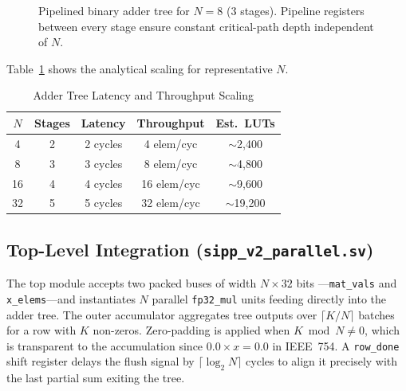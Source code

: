 \documentclass[journal,a4paper]{IEEEtran}
\begin{document}
\begin{figure}[!t]
\caption{Pipelined binary adder tree for $N=8$ (3 stages). Pipeline
registers between every stage ensure constant critical-path depth
independent of $N$.}
\label{fig:addertree}
\end{figure}

Table~\ref{tab:scaling} shows the analytical scaling for representative $N$.

\begin{table}[!t]
\centering
\caption{Adder Tree Latency and Throughput Scaling}
\label{tab:scaling}
\begin{tabular}{ccccc}
\toprule
$N$ & Stages & Latency & Throughput & Est.\ LUTs \\
\midrule
4  & 2 & 2 cycles & 4 elem/cyc  & $\sim$2,400 \\
8  & 3 & 3 cycles & 8 elem/cyc  & $\sim$4,800 \\
16 & 4 & 4 cycles & 16 elem/cyc & $\sim$9,600 \\
32 & 5 & 5 cycles & 32 elem/cyc & $\sim$19,200\\
\bottomrule
\end{tabular}
\end{table}

\subsection{Top-Level Integration (\texttt{sipp\_v2\_parallel.sv})}

The top module accepts two packed buses of width $N \times 32$ bits
---\texttt{mat\_vals} and \texttt{x\_elems}---and instantiates $N$
parallel \texttt{fp32\_mul} units feeding directly into the adder tree.
The outer accumulator aggregates tree outputs over $\lceil K/N \rceil$
batches for a row with $K$ non-zeros.
Zero-padding is applied when $K \bmod N \neq 0$, which is transparent
to the accumulation since $0.0 \times x = 0.0$ in IEEE~754.
A \texttt{row\_done} shift register delays the flush signal by
$\lceil\log_2 N\rceil$ cycles to align it precisely with the last
partial sum exiting the tree.
\end{document}
